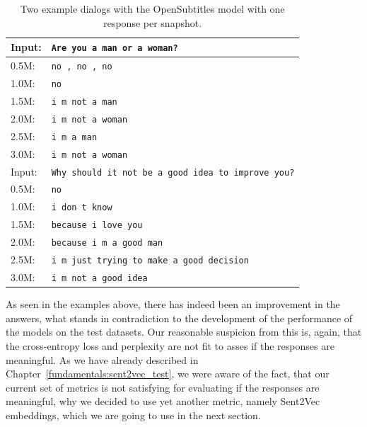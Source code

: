 \begin{table}[H]
	\centering
	\begin{adjustbox}{max width=\textwidth}
		\begin{tabular}{ll}
			\toprule
			Input: 	& \texttt{Are you a man or a woman?}\\
			\midrule
			0.5M: 	& \texttt{no , no , no}\\
			1.0M: 	& \texttt{no}\\
			1.5M:	& \texttt{i m not a man}\\
			2.0M:	& \texttt{i m not a woman}\\
			2.5M:	& \texttt{i m a man}\\
			3.0M:	& \texttt{i m not a woman}\\
			\midrule
			Input: 	& \texttt{Why should it not be a good idea to improve you?}\\
			\midrule
			0.5M: 	& \texttt{no}\\
			1.0M: 	& \texttt{i don t know}\\
			1.5M:	& \texttt{because i love you}\\
			2.0M:	& \texttt{because i m a good man}\\
			2.5M:	& \texttt{i m just trying to make a good decision}\\
			3.0M:	& \texttt{i m not a good idea}\\
			\bottomrule
		\end{tabular}
	\end{adjustbox}
	\caption{Two example dialogs with the OpenSubtitles model with one response per snapshot.}
	\label{results:example_output:opensubtitles}
\end{table}

As seen in the examples above, there has indeed been an improvement in the answers, what stands in contradiction to the development of the performance of the models on the test datasets. Our reasonable suspicion from this is, again, that the cross-entropy loss and perplexity are not fit to asses if the responses are meaningful. As we have already described in Chapter~\ref{fundamentals:sent2vec_test}, we were aware of the fact, that our current set of metrics is not satisfying for evaluating if the responses are meaningful, why we decided to use yet another metric, namely Sent2Vec embeddings, which we are going to use in the next section.

